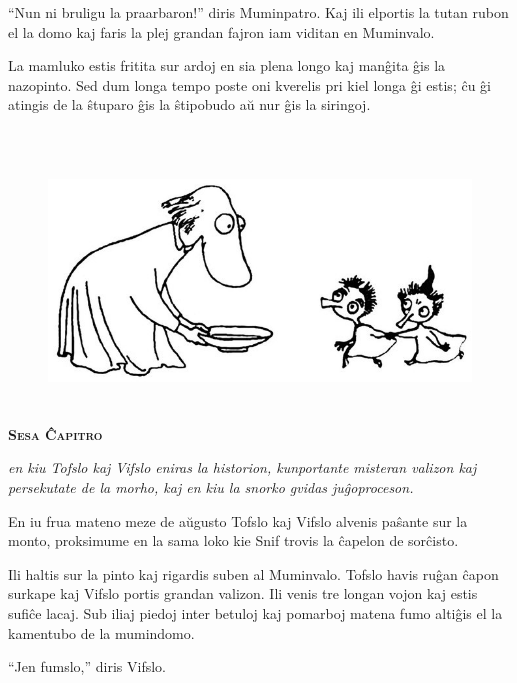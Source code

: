 ``Nun ni bruligu la praarbaron!'' diris Muminpatro. Kaj ili elportis la tutan rubon el la domo kaj faris la plej grandan fajron iam viditan en Muminvalo.

La mamluko estis fritita sur ardoj en sia plena longo kaj manĝita ĝis la nazopinto. Sed dum longa tempo poste oni kverelis pri kiel longa ĝi estis; ĉu ĝi atingis de la ŝtuparo ĝis la ŝtipobudo aŭ nur ĝis la siringoj.

\chapter[Sesa Ĉapitro]{}


\begin{figure}[htbp]
\centering
\includegraphics[width=395pt,height=189pt]{_29.jpg}
\caption{}
\label{_29}
\end{figure}

\begin{center}\textbf{\Large\color{ForestGreen}\textsc{Sesa Ĉapitro}}\end{center}

\noindent\textit{en kiu Tofslo kaj Vifslo eniras la historion, kunportante misteran valizon kaj persekutate de la morho, kaj en kiu la snorko gvidas juĝoproceson.}
\hfill \break
\hypertarget{Sesa Ĉapitro}{}
\label{Sesa Ĉapitro}


\noindent En iu frua mateno meze de aŭgusto Tofslo kaj Vifslo alvenis paŝante sur la monto, proksimume en la sama loko kie Snif trovis la ĉapelon de sorĉisto.

Ili haltis sur la pinto kaj rigardis suben al Muminvalo. Tofslo havis ruĝan ĉapon surkape kaj Vifslo portis grandan valizon. Ili venis tre longan vojon kaj estis sufiĉe lacaj. Sub iliaj piedoj inter betuloj kaj pomarboj matena fumo altiĝis el la kamentubo de la mumindomo.

``Jen fumslo,'' diris Vifslo.

